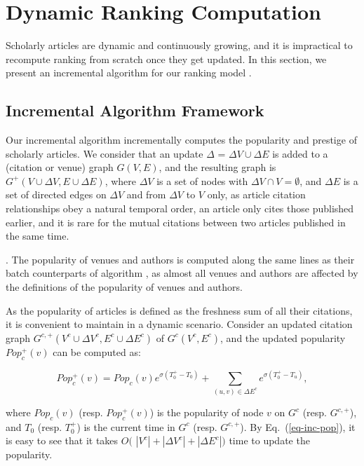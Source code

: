 \section{Dynamic Ranking Computation}
\label{sec-incAlg}

Scholarly articles are dynamic and continuously growing, and it is impractical to recompute ranking from scratch once they get updated. In this section, we present an incremental algorithm for our ranking model \ensemblerank.


\subsection{Incremental Algorithm Framework}
\label{subsec-inc-alg}




Our incremental algorithm \incensemble incrementally computes the popularity and prestige of scholarly articles.
We consider that an update $\Delta$ = $\Delta V\cup\Delta E$ is added to a   (citation or venue) graph $G(V, E)$,
and the resulting graph is $G^+(V\cup\Delta V, E\cup\Delta E)$, where
$\Delta V$ is a set of nodes with $\Delta V\cap V = \emptyset$, and $\Delta E$ is a set of directed edges on $\Delta V$ and from $\Delta V$ to $V$ only, as article citation relationships obey a natural temporal order, \ie an article only cites those published earlier, and it is rare for the mutual citations between two articles published in the same time.


.
The popularity of venues and authors is computed along the same lines as their batch counterparts of algorithm \batensemble,
as almost all venues and authors are affected  by the definitions of the popularity of venues and authors.


As the popularity of articles is defined as the freshness sum of all their citations, it is convenient to maintain in a dynamic scenario. Consider an updated citation graph $G^{c,+}(V^c\cup\Delta V^c, E^c\cup\Delta E^c)$ of $G^c(V^c, E^c)$, and the updated popularity $Pop_{c}^+(v)$ can be computed as:

\vspace{-1ex}
\begin{small}
\begin{equation}\label{eq-inc-pop}
Pop_c^+(v) = Pop_c(v) {e^{\sigma (T^+_0-T_0)}} + \sum_{(u,v)\in \Delta E^c} {e^{\sigma (T^+_0-T_u)}},
\end{equation}
\end{small}
\noindent
where $Pop_c(v)$ (resp. $Pop_c^+(v)$) is the popularity of node $v$ on $G^c$ (resp. $G^{c,+}$), and
 $T_0$ (resp. $T^+_0$) is the current time in $G^c$ (resp. $G^{c,+}$).
%
By Eq.~(\ref{eq-inc-pop}), it is easy to see that it takes $O($ $|V^c|+|\Delta V^c|+|\Delta E^c|)$ time to update the popularity.



